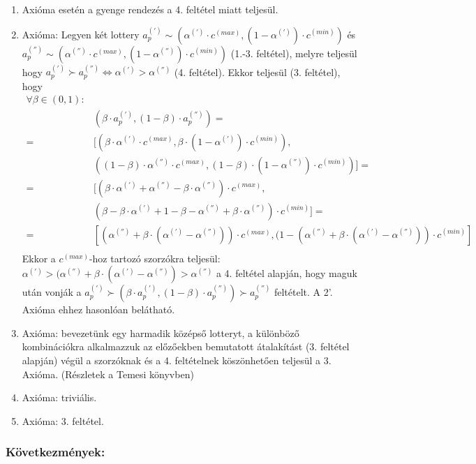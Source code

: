 \documentclass[a4paper,12pt]{article}
\begin{document}
\begin{enumerate}
\item Axióma esetén a gyenge rendezés a 4. feltétel miatt teljesül.
\item Axióma: Legyen két lottery $a^{(')}_p \sim (\alpha^{(')}\cdot c^{(max)}, (1-\alpha^{(')})\cdot c^{(min)})$ és 
$a^{('')}_p \sim (\alpha^{('')}\cdot c^{(max)}, (1-\alpha^{('')})\cdot c^{(min)})$ (1.-3. feltétel), melyre teljesül hogy $a^{(')}_p \succ a^{('')}_p \Leftrightarrow \alpha^{(')} > \alpha^{('')}$ (4. feltétel). Ekkor teljesül (3. feltétel), hogy
\begin{equation}
\begin{split}
\forall \beta \in (0,1):& \\
& (\beta\cdot a^{(')}_p, (1-\beta)\cdot a^{('')}_p) = \\ 
= & [(\beta\cdot \alpha^{(')}\cdot c^{(max)}, \beta\cdot (1-\alpha^{(')})\cdot c^{(min)}), \\
& ((1-\beta)\cdot \alpha^{('')}\cdot c^{(max)}, (1-\beta)\cdot (1-\alpha^{('')})\cdot c^{(min)})] = \\
= & [(\beta\cdot \alpha^{(')} + \alpha^{('')}-\beta\cdot \alpha^{('')} )\cdot c^{(max)},\\
& (\beta-\beta\cdot \alpha^{(')} + 1-\beta-\alpha^{('')}+\beta\cdot \alpha^{('')})\cdot c^{(min)}] = \\ 
= & [(\alpha^{('')} + \beta\cdot (\alpha^{(')} - \alpha^{('')} ))\cdot c^{(max)},(1 - (\alpha^{('')} + \beta\cdot (\alpha^{(')} - \alpha^{('')} ))\cdot c^{(min)}] \\
\end{split}
\end{equation} 
Ekkor a $c^{(max)}$-hoz tartozó szorzókra teljesül: $\alpha^{(')} >(\alpha^{('')} + \beta\cdot (\alpha^{(')} - \alpha^{('')}) > \alpha^{('')}$ a 4. feltétel alapján, hogy maguk után vonják a $a^{(')}_p \succ (\beta\cdot a^{(')}_p , (1-\beta)\cdot a^{('')}_p ) \succ a^{('')}_p$ feltételt. A 2'. Axióma ehhez hasonlóan belátható.
\item Axióma: bevezetünk egy harmadik középső lotteryt, a különböző kombinációkra alkalmazzuk az előzőekben bemutatott átalakítást (3. feltétel alapján) végül a szorzóknak és a 4. feltételnek köszönhetően teljesül a 3. Axióma. (Részletek a Temesi könyvben) 
\item Axióma: triviális.
\item Axióma: 3. feltétel.
\end{enumerate}

\subsubsection{Következmények: }
\end{document}
